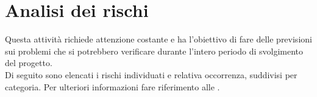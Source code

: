 \section{Analisi dei rischi}

Questa attività richiede attenzione costante e ha l'obiettivo di fare delle previsioni sui problemi che si potrebbero verificare durante l'intero periodo di svolgimento del progetto. \\
Di seguito sono elencati i rischi individuati e relativa occorrenza, suddivisi per categoria. Per ulteriori informazioni fare riferimento alle .

\setlength\arrayrulewidth{1pt}
\newlength\colA\setlength\colA{2cm}
\newlength\colB\setlength\colB{7cm}
\newlength\colC\setlength\colC{6cm}
\newlength\colD\setlength\colD{0.9cm}
\newlength\total\setlength\total{\dimexpr\colA+\colB+\colC+\colD+6\tabcolsep\relax}
\renewcommand{\arraystretch}{2}%
